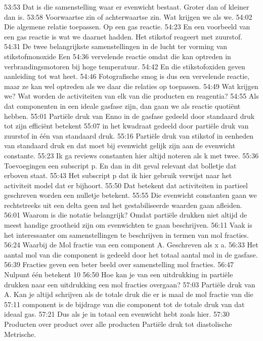 53:53
Dat is die samenstelling waar er evenwicht bestaat. Groter dan of kleiner dan is.
53:58
Voorwaartse zin of achterwaartse zin. Wat krijgen we als we.
54:02
Die algemene relatie toepassen. Op een gas reactie.
54:23
En een voorbeeld van een gas reactie is wat we daarnet hadden. Het stikstof reageert met zuurstof.
54:31
De twee belangrijkste samenstellingen in de lucht ter vorming van stikstofmonoxide Een
54:36
vervelende reactie omdat die kan optreden in verbrandingsmotoren bij hoge temperatuur.
54:42
En die stikstofoxiden geven aanleiding tot wat heet.
54:46
Fotografische smog is dus een vervelende reactie, maar ze kan wel optreden als we daar die relaties op toepassen.
54:49
Wat krijgen we? Wat worden de activiteiten van elk van die producten en reagentia?
54:55
Als dat componenten in een ideale gasfase zijn, dan gaan we als reactie quotiënt hebben.
55:01
Partiële druk van Enno in de gasfase gedeeld door standaard druk tot zijn efficiënt betekent
55:07
in het kwadraat gedeeld door partiële druk van zuurstof in één van standaard druk.
55:16
Partiële druk van stikstof in eenheden van standaard druk en dat moet bij evenwicht gelijk zijn aan de evenwicht constante.
55:23
Ik ga reviews constanten hier altijd noteren als k met twee.
55:36
Toevoegingen een subscript p. En dan in dit geval relevant dat bolletje dat erboven staat.
55:43
Het subscript p dat ik hier gebruik verwijst naar het activiteit model dat er bijhoort.
55:50
Dat betekent dat activiteiten in partieel geschreven worden een nulletje betekent.
55:55
Die evenwicht constanten gaan we rechtstreeks uit een delta geen nul het gestabiliseerde waarden gaan afleiden.
56:01
Waarom is die notatie belangrijk? Omdat partiële drukken niet altijd de meest handige grootheid zijn om evenwichten te gaan beschrijven.
56:11
Vaak is het interessanter om samenstellingen te beschrijven in termen van mol fracties.
56:24
Waarbij de Mol fractie van een component A. Geschreven als x a.
56:33
Het aantal mol van die component is gedeeld door het totaal aantal mol in de gasfase.
56:39
Fracties geven een beter beeld over samenstelling mol fracties.
56:47
Nulpunt één betekent 10%
56:50
Hoe kan je van een uitdrukking in partiële drukken naar een uitdrukking een mol fracties overgaan?
57:03
Partiële druk van A. Kan je altijd schrijven als de totale druk die er is maal de mol fractie van die
57:11
component is de bijdrage van die component tot de totale druk van dat ideaal gas.
57:21
Dus als je in totaal een evenwicht hebt zoals hier.
57:30
Producten over product over alle producten Partiële druk tot diastolische Metrische.
